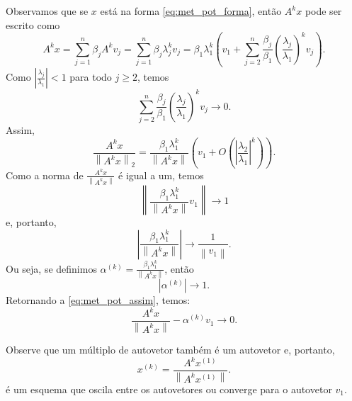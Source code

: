 Observamos que se $x$ está na forma \eqref{eq:met_pot_forma}, então $A^k x$ pode ser escrito como
\begin{equation}
  A^{k} x = \sum_{j=1}^n \beta_j A^k v_{j} = \sum_{j=1}^n \beta_j \lambda_j^k v_{j} = \beta_1\lambda_1^k\left(v_1+\sum_{j=2}^n\frac{\beta_j}{\beta_1} \left(\frac{\lambda_j}{\lambda_1}\right)^k v_{j}\right).
\end{equation}
Como $\left|\frac{\lambda_j}{\lambda_1}\right|<1$ para todo $j\geq 2$, temos
\begin{equation}
  \sum_{j=2}^n\frac{\beta_j}{\beta_1} \left(\frac{\lambda_j}{\lambda_1}\right)^k v_{j} \to 0.
\end{equation}
Assim,
\begin{equation}\label{eq:met_pot_assim}
  \frac{A^k x}{\left\|A^k x\right\|_2} = \frac{\beta_1\lambda_1^k}{\left\|A^k x\right\|}\left( v_1 + O\left(\left|\frac{\lambda_2}{\lambda_1}\right|^k\right)\right).
\end{equation}
Como a norma de $\frac{A^k x}{\left\|A^k x\right\|}$ é igual a um, temos
\begin{equation}
  \left\|\frac{\beta_1\lambda_1^k}{\left\|A^k x\right\|}v_1\right\| \to 1
\end{equation}
e, portanto,
\begin{equation}
  \left|\frac{\beta_1\lambda_1^k}{\left\|A^k x\right\|}\right| \to \frac{1}{\left\|v_1\right\|}.
\end{equation}
Ou seja, se definimos $\alpha^{(k)}=\frac{\beta_1\lambda_1^k}{\left\|A^k x\right\|}$, então
\begin{equation}
  |\alpha^{(k)}|\to 1.
\end{equation}
Retornando a \eqref{eq:met_pot_assim}, temos:
\begin{equation}
  \frac{A^k x}{\left\|A^k x\right\|}-\alpha^{(k)} v_1 \to 0.
\end{equation}

Observe que um múltiplo de autovetor também é um autovetor e, portanto,
\begin{equation}
  x^{(k)}=\frac{A^k x^{(1)}}{\left\|A^k x^{(1)}\right\|}.
\end{equation}
é um esquema que oscila entre os autovetores ou converge para o autovetor $v_1$.

